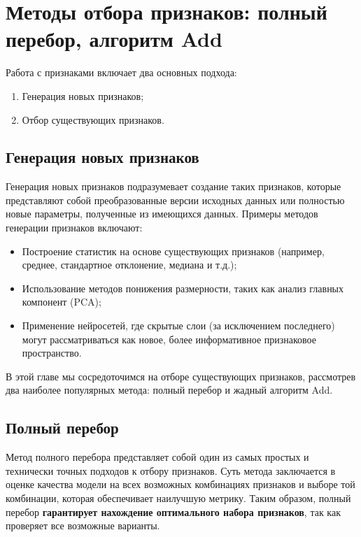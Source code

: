 \section{Методы отбора признаков: полный перебор, алгоритм Add}

Работа с признаками включает два основных подхода:
\begin{enumerate}
    \item Генерация новых признаков;
    \item Отбор существующих признаков.
\end{enumerate}

\subsection{Генерация новых признаков}
Генерация новых признаков подразумевает создание таких признаков, которые представляют собой преобразованные версии исходных данных или полностью новые параметры, полученные из имеющихся данных. Примеры методов генерации признаков включают:

\begin{itemize}
    \item Построение статистик на основе существующих признаков (например, среднее, стандартное отклонение, медиана и т.д.);
    \item Использование методов понижения размерности, таких как анализ главных компонент (PCA);
    \item Применение нейросетей, где скрытые слои (за исключением последнего) могут рассматриваться как новое, более информативное признаковое пространство.
\end{itemize}

В этой главе мы сосредоточимся на отборе существующих признаков, рассмотрев два наиболее популярных метода: полный перебор и жадный алгоритм Add.

\subsection{Полный перебор}

Метод полного перебора представляет собой один из самых простых и технически точных подходов к отбору признаков. Суть метода заключается в оценке качества модели на всех возможных комбинациях признаков и выборе той комбинации, которая обеспечивает наилучшую метрику. Таким образом, полный перебор \textbf{гарантирует нахождение оптимального набора признаков}, так как проверяет все возможные варианты.


